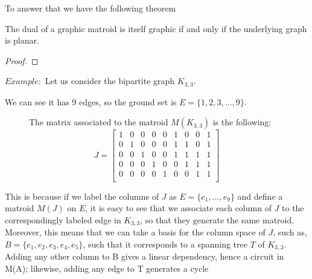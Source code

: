 To answer that we have the following theorem

\begin{theorem}
    \item  The dual of a graphic matroid is itself graphic if and only if the underlying graph is planar.
\end{theorem}

\begin{proof}
    
\end{proof}



$Example:$ Let us consider the bipartite graph $K_{3,3}$.
\begin{figure}[H]
\centering
{}
\end{figure}

We can see it has 9 edges, so the ground set is $E=\{1,2,3, \dots, 9\} $.

\begin{figure}[H]
The matrix associated to the matroid $M(K_{3,3})$ is the following:
$$J = \begin{bmatrix}
    1 & 0 & 0 & 0 & 0 & 1 & 0 & 0 & 1\\
    0 & 1 & 0 & 0 & 0 & 1 & 1 & 0 & 1\\
    0 & 0 & 1 & 0 & 0 & 1 & 1 & 1 & 1\\
    0 & 0 & 0 & 1 & 0 & 0 & 1 & 1 & 1\\
    0 & 0 & 0 & 0 & 1 & 0 & 0 & 1 & 1\\
\end{bmatrix}$$
\end{figure}

This is because if we label the columns of $J$ as $E = \{e_1,\dots, e_9\}$ and define a matroid $M(J)$ on $E$, it is easy to see that we associate each column of $J$ to the correspondingly labeled edge in $K_{3,3}$, so that they generate the same matroid. Moreover, this means that we can take a basis for the column space of $J$, such as, $B = \{e_1, e_2, e_3, e_4, e_5\}$, such that it corresponds to a spanning tree $T$ of $K_{3,3}$. Adding any other column to B gives a linear dependency,
hence a circuit in M(A); likewise, adding any edge to T generates a cycle



